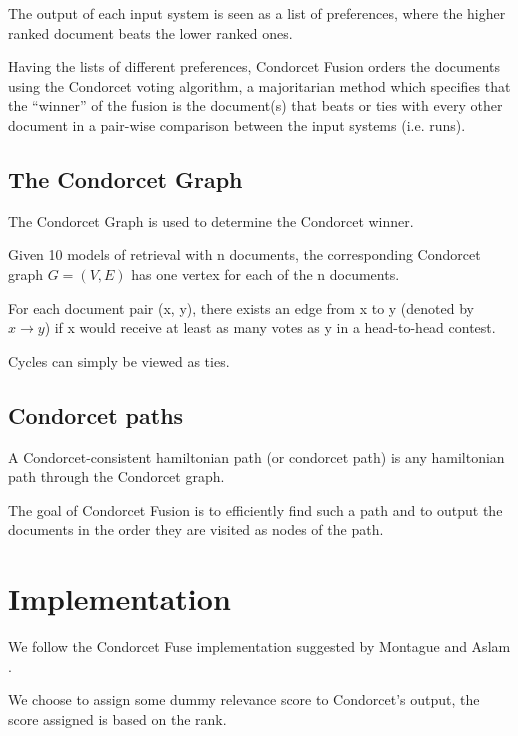     The output of each input system is seen as a list of preferences, where the higher ranked document beats the lower ranked ones.
    
    Having the lists of different preferences, Condorcet Fusion orders the documents using the Condorcet voting algorithm, a majoritarian method which specifies
    that the ``winner'' of the fusion is the document(s) that beats or ties
    with every other document in a pair-wise comparison between the input
    systems (i.e. runs).    
    

	\subsection{The Condorcet Graph}
	
	The Condorcet Graph is used to determine the Condorcet winner.

	Given 10 models of retrieval with n documents, the corresponding
	Condorcet graph $G = (V, E)$ has one vertex for each of the n documents.

	For each document pair (x, y), there exists an edge from x to
	y (denoted by $x \rightarrow y$) if x would receive at least as many votes as y in a head-to-head contest.

	Cycles can simply be viewed as ties.


	\subsection{Condorcet paths}

	A Condorcet-consistent hamiltonian path (or condorcet path) is any
	hamiltonian path through the Condorcet graph.

	The goal of Condorcet Fusion is to efficiently find such a path and to output the documents in the order they are visited as nodes of the path.

    \section{Implementation}

	We follow the Condorcet Fuse implementation suggested by Montague and Aslam \cite{3}.
	
	We choose to assign some dummy relevance score to Condorcet's output, the score assigned is based on the rank.

